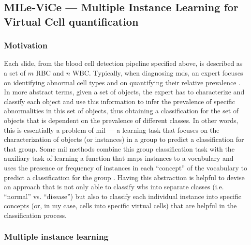 \subsection{MILe-ViCe --- Multiple Instance Learning for Virtual Cell quantification}

\subsubsection{Motivation}

Each slide, from the blood cell detection pipeline specified above, is described as a set of $m$ RBC and $n$ WBC. Typically, when diagnosing \ac{mds}, an expert focuses on identifying abnormal cell types and on quantifying their relative prevalence \cite{Valent2017-uh}. In more abstract terms, given a set of objects, the expert has to characterize and classify each object and use this information to infer the prevalence of specific abnormalities in this set of objects, thus obtaining a classification for the set of objects that is dependent on the prevalence of different classes. In other words, this is essentially a problem of \ac{mil} --- a learning task that focuses on the characterization of objects (or instances) in a group to predict a classification for that group. Some \ac{mil} methods combine this group classification task with the auxiliary task of learning a function that maps instances to a vocabulary and uses the presence or frequency of instances in each “concept” of the vocabulary to predict a classification for the group \cite{Amores2013-ym}. Having this abstraction is helpful to devise an approach that is not only able to classify \ac{wbs} into separate classes (i.e. “normal” vs. “disease”) but also to classify each individual instance into specific concepts (or, in my case, cells into specific virtual cells) that are helpful in the classification process. 

\subsubsection{Multiple instance learning}

